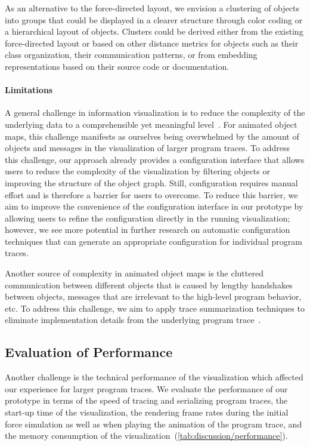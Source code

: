 As an alternative to the force-directed layout, we envision a clustering of objects into groups that could be displayed in a clearer structure through color coding or a hierarchical layout of objects.
Clusters could be derived either from the existing force-directed layout or based on other distance metrics for objects such as their class organization, their communication patterns, or from embedding representations based on their source code or documentation.

\paragraph{Limitations}

A general challenge in information visualization is to reduce the complexity of the underlying data to a comprehensible yet meaningful level~\cite{robertson2009scale}.
For animated object maps, this challenge manifests as ourselves being overwhelmed by the amount of objects and messages in the visualization of larger program traces.
To address this challenge, our approach already provides a configuration interface that allows users to reduce the complexity of the visualization by filtering objects or improving the structure of the object graph.
Still, configuration requires manual effort and is therefore a barrier for users to overcome.
To reduce this barrier, we aim to improve the convenience of the configuration interface in our prototype by allowing users to refine the configuration directly in the running visualization; however, we see more potential in further research on automatic configuration techniques that can generate an appropriate configuration for individual program traces.

Another source of complexity in animated object maps is the cluttered communication between different objects that is caused by lengthy handshakes between objects, messages that are irrelevant to the high-level program behavior, etc.
To address this challenge, we aim to apply trace summarization techniques to eliminate implementation details from the underlying program trace~\cite{hamouLhadj2006summarizing,noda2017identifying}.

\subsection{Evaluation of Performance}

Another challenge is the technical performance of the visualization which affected our experience for larger program traces.
We evaluate the performance of our prototype in terms of the speed of tracing and serializing program traces, the start-up time of the visualization, the rendering frame rates during the initial force simulation as well as when playing the animation of the program trace, and the memory consumption of the visualization~(\cref{tab:discussion/performance}).

